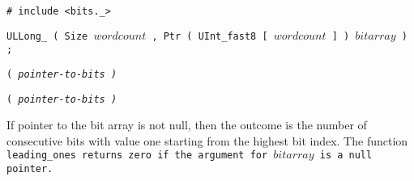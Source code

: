 
\tt{# include <bits._>}

\tt{ULLong_} \s\s\tt{( Size} $wordcount$
\tt{, Ptr ( UInt_fast8 [} $wordcount$ \tt{] )} $bitarray$ \tt{) ;}

\s\s
\tt{(} \it{pointer-to-bits} \tt{)}

\s\s\s
\tt{(} \it{pointer-to-bits} \tt{)}


If pointer to the bit array is not null, then the outcome is the number
of consecutive bits with value one starting from the highest bit index.
The function \tt{leading_ones} returns zero if
the argument for $bitarray$ is a null pointer.
